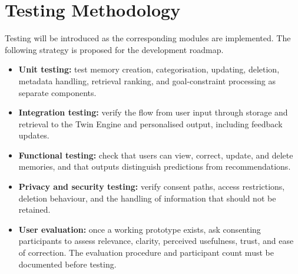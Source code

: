 \documentclass{tietreport}
\begin{document}
\section{Testing Methodology}
Testing will be introduced as the corresponding modules are implemented. The following strategy is proposed for the development roadmap.
\begin{itemize}[leftmargin=*]
  \item \textbf{Unit testing:} test memory creation, categorisation, updating, deletion, metadata handling, retrieval ranking, and goal-constraint processing as separate components.
  \item \textbf{Integration testing:} verify the flow from user input through storage and retrieval to the Twin Engine and personalised output, including feedback updates.
  \item \textbf{Functional testing:} check that users can view, correct, update, and delete memories, and that outputs distinguish predictions from recommendations.
  \item \textbf{Privacy and security testing:} verify consent paths, access restrictions, deletion behaviour, and the handling of information that should not be retained.
  \item \textbf{User evaluation:} once a working prototype exists, ask consenting participants to assess relevance, clarity, perceived usefulness, trust, and ease of correction. The evaluation procedure and participant count must be documented before testing.
\end{itemize}

\clearpage
{}
\end{document}
